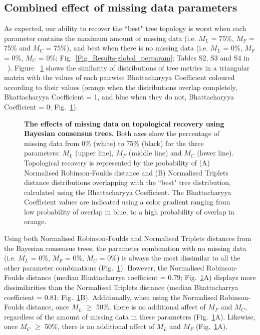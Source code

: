 \documentclass[10pt,letterpaper]{article}
\begin{document}
\subsection*{Combined effect of missing data parameters}
As expected, our ability to recover the ``best" tree topology is worst when each parameter contains the maximum amount of missing data (i.e. $M_{L}$ = 75\%, $M_{F}$ = 75\% and $M_{C}$ = 75\%), and best when there is no missing data (i.e. $M_{L}$ = 0\%, $M_{F}$ = 0\%, $M_{C}$ = 0\%; Fig.~\ref{Fig_Results-global_perparam}; Tables S2, S3 and S4 in ~). Figure ~\ref{Fig_Results-paircomp_within} shows the similarity of distributions of tree metrics in a triangular matrix with the values of each pairwise Bhattacharyya Coefficient coloured according to their values (orange when the distributions overlap completely, Bhattacharyya Coefficient = 1, and blue when they do not, Bhattacharyya Coefficient = 0; Fig.~\ref{Fig_Results-paircomp_within}). 

\begin{figure}[]
\caption{{\bf The effects of missing data on topological recovery using Bayesian consensus trees.}
 Both axes show the percentage of missing data from 0\% (white) to 75\% (black) for the three parameters: $M_{L}$ (upper line), $M_{F}$ (middle line) and $M_{C}$ (lower line). Topological recovery is represented by the probability of (A) Normalised Robinson-Foulds distance and (B) Normalised Triplets distance distributions overlapping with the ``best" tree distribution, calculated using the Bhattacharyya Coefficient. The Bhattacharyya Coefficient values are indicated using a color gradient ranging from low probability of overlap in blue, to a high probability of overlap in orange.
}
\label{Fig_Results-paircomp_within}
\end{figure}

Using both Normalised Robinson-Foulds and Normalised Triplets distances from the Bayesian consensus trees, the parameter combination with no missing data (i.e. $M_{L}$ = 0\%, $M_{F}$ = 0\%, $M_{C}$ = 0\%) is always the most dissimilar to all the other parameter combinations (Fig.~\ref{Fig_Results-paircomp_within}). However, the Normalised Robinson-Foulds distance (median Bhattacharrya coefficient = 0.79; Fig.~\ref{Fig_Results-paircomp_within}A) displays more dissimilarities than the Normalised Triplets distance (median Bhattacharrya coefficient = 0.81; Fig.~\ref{Fig_Results-paircomp_within}B). Additionally, when using the Normalised Robinson-Foulds distance, once $M_{L}$ $\geq$ 50\%, there is no additional affect of $M_{F}$ and $M_{C}$, regardless of the amount of missing data in these parameters (Fig.~\ref{Fig_Results-paircomp_within}A). Likewise, once $M_{C}$ $\geq$ 50\%, there is no additional affect of $M_{L}$ and $M_{F}$ (Fig.~\ref{Fig_Results-paircomp_within}A).
\end{document}
